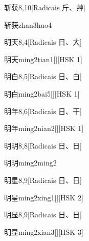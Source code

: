\begin{entry}{斩获}{8,10}[Radicais ⽄、⾋]
  \begin{phonetics}{斩获}{zhan3huo4}
  \end{phonetics}
\end{entry}

\begin{entry}{明天}{8,4}[Radicais ⽇、⼤]
  \begin{phonetics}{明天}{ming2tian1}[][HSK 1]
  \end{phonetics}
\end{entry}

\begin{entry}{明白}{8,5}[Radicais ⽇、⽩]
  \begin{phonetics}{明白}{ming2bai5}[][HSK 1]
  \end{phonetics}
\end{entry}

\begin{entry}{明年}{8,6}[Radicais ⽇、⼲]
  \begin{phonetics}{明年}{ming2nian2}[][HSK 1]
  \end{phonetics}
\end{entry}

\begin{entry}{明明}{8,8}[Radicais ⽇、⽇]
  \begin{phonetics}{明明}{ming2ming2}
  \end{phonetics}
\end{entry}

\begin{entry}{明星}{8,9}[Radicais ⽇、⽇]
  \begin{phonetics}{明星}{ming2xing1}[][HSK 2]
  \end{phonetics}
\end{entry}

\begin{entry}{明显}{8,9}[Radicais ⽇、⽇]
  \begin{phonetics}{明显}{ming2xian3}[][HSK 3]
  \end{phonetics}
\end{entry}

